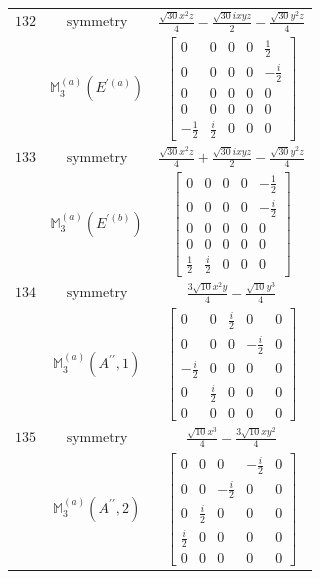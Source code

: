 \documentclass[fleqn,8pt,landscape]{jsarticle}
\begin{document}
\begin{longtable}{ccc}
$ 132 $ & $ \text{symmetry} $ & $ \frac{\sqrt{30} x^{2} z}{4} - \frac{\sqrt{30} i x y z}{2} - \frac{\sqrt{30} y^{2} z}{4} $ \\
$  $ & $ \mathbb{M}_{3}^{(a)}(E^{\prime(a)}) $ & $ \begin{bmatrix} 0 & 0 & 0 & 0 & \frac{1}{2} \\ 0 & 0 & 0 & 0 & - \frac{i}{2} \\ 0 & 0 & 0 & 0 & 0 \\ 0 & 0 & 0 & 0 & 0 \\ - \frac{1}{2} & \frac{i}{2} & 0 & 0 & 0 \end{bmatrix} $ \\ \hline
$ 133 $ & $ \text{symmetry} $ & $ \frac{\sqrt{30} x^{2} z}{4} + \frac{\sqrt{30} i x y z}{2} - \frac{\sqrt{30} y^{2} z}{4} $ \\
$  $ & $ \mathbb{M}_{3}^{(a)}(E^{\prime(b)}) $ & $ \begin{bmatrix} 0 & 0 & 0 & 0 & - \frac{1}{2} \\ 0 & 0 & 0 & 0 & - \frac{i}{2} \\ 0 & 0 & 0 & 0 & 0 \\ 0 & 0 & 0 & 0 & 0 \\ \frac{1}{2} & \frac{i}{2} & 0 & 0 & 0 \end{bmatrix} $ \\ \hline
$ 134 $ & $ \text{symmetry} $ & $ \frac{3 \sqrt{10} x^{2} y}{4} - \frac{\sqrt{10} y^{3}}{4} $ \\
$  $ & $ \mathbb{M}_{3}^{(a)}(A^{\prime\prime},1) $ & $ \begin{bmatrix} 0 & 0 & \frac{i}{2} & 0 & 0 \\ 0 & 0 & 0 & - \frac{i}{2} & 0 \\ - \frac{i}{2} & 0 & 0 & 0 & 0 \\ 0 & \frac{i}{2} & 0 & 0 & 0 \\ 0 & 0 & 0 & 0 & 0 \end{bmatrix} $ \\ \hline
$ 135 $ & $ \text{symmetry} $ & $ \frac{\sqrt{10} x^{3}}{4} - \frac{3 \sqrt{10} x y^{2}}{4} $ \\
$  $ & $ \mathbb{M}_{3}^{(a)}(A^{\prime\prime},2) $ & $ \begin{bmatrix} 0 & 0 & 0 & - \frac{i}{2} & 0 \\ 0 & 0 & - \frac{i}{2} & 0 & 0 \\ 0 & \frac{i}{2} & 0 & 0 & 0 \\ \frac{i}{2} & 0 & 0 & 0 & 0 \\ 0 & 0 & 0 & 0 & 0 \end{bmatrix} $ \\ \hline

\end{longtable}
\end{document}
